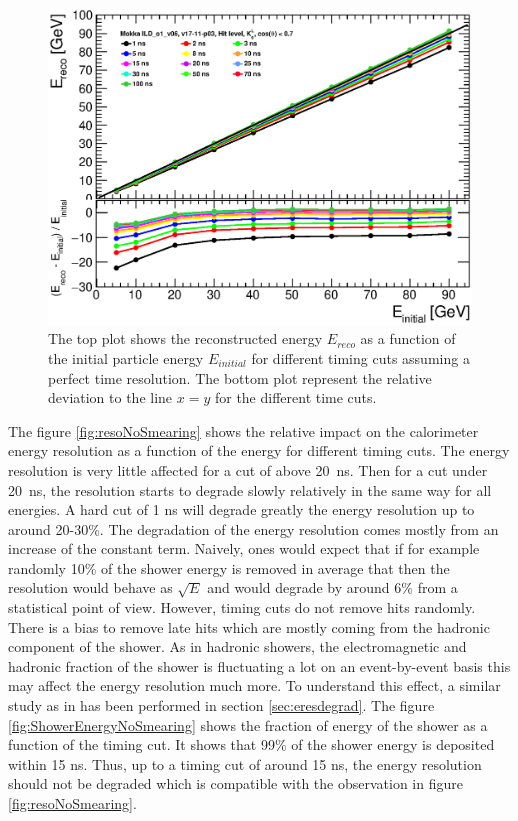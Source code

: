 \begin{figure}[htbp!]
  \centering
  \includegraphics[width=0.6\linewidth]{../Thesis_Plots/ILD/NoSmearing/Plots/Linearity_TimeCuts_noSmearing.eps}
  \caption{The top plot shows the reconstructed energy $E_{reco}$ as a function of the initial particle energy $E_{initial}$ for different timing cuts assuming a perfect time resolution. The bottom plot represent the relative deviation to the line $x=y$ for the different time cuts.} \label{fig:linearityNoSmearing}
\end{figure}

The figure \ref{fig:resoNoSmearing} shows the relative impact on the calorimeter energy resolution as a function of the energy for different timing cuts. The energy resolution is very little affected for a cut of above \SI{20}{\nano\second}. Then for a cut under \SI{20}{\nano\second}, the resolution starts to degrade slowly relatively in the same way for all energies. A hard cut of 1 ns will degrade greatly the energy resolution up to around 20-30\%. The degradation of the energy resolution comes mostly from an increase of the constant term. Naively, ones would expect that if for example randomly 10\% of the shower energy is removed in average that then the resolution would behave as $\sqrt{E}$ and would degrade by around 6\% from a statistical point of view. However, timing cuts do not remove hits randomly. There is a bias to remove late hits which are mostly coming from the hadronic component of the shower. As in hadronic showers, the electromagnetic and hadronic fraction of the shower is fluctuating a lot on an event-by-event basis this may affect the energy resolution much more. To understand this effect, a similar study as in \cite{SoftCompNew2012} has been performed in section \ref{sec:eresdegrad}. The figure \ref{fig:ShowerEnergyNoSmearing} shows the fraction of energy of the shower as a function of the timing cut. It shows that 99\% of the shower energy is deposited within 15 ns. Thus, up to a timing cut of around 15 ns, the energy resolution should not be degraded which is compatible with the observation in figure \ref{fig:resoNoSmearing}.

